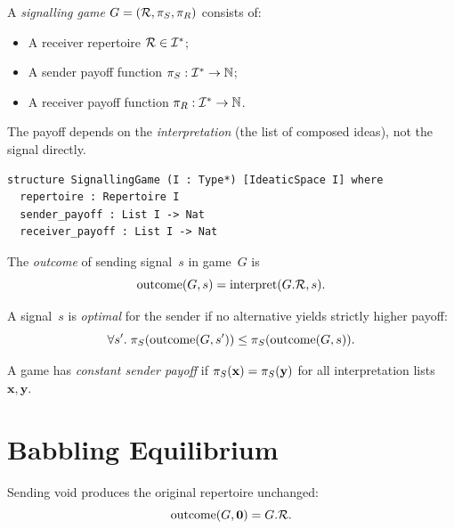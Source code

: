 \begin{definition}
\label{def:signalling-game}
A \emph{signalling game} $G = (\mathcal{R}, \pi_S, \pi_R)$ consists of:
\begin{itemize}
  \item A receiver repertoire $\mathcal{R} \in \mathcal{I}^*$;
  \item A sender payoff function $\pi_S : \mathcal{I}^* \to \mathbb{N}$;
  \item A receiver payoff function $\pi_R : \mathcal{I}^* \to \mathbb{N}$.
\end{itemize}
The payoff depends on the \emph{interpretation} (the list of composed
ideas), not the signal directly.
\end{definition}

\begin{lstlisting}[caption={SignallingGame in Lean~4},label=lst:signalling-game]
structure SignallingGame (I : Type*) [IdeaticSpace I] where
  repertoire : Repertoire I
  sender_payoff : List I -> Nat
  receiver_payoff : List I -> Nat
\end{lstlisting}

\begin{definition}[Outcome]
\label{def:outcome}
The \emph{outcome} of sending signal~$s$ in game~$G$ is
\[
  \operatorname{outcome}(G, s) = \operatorname{interpret}(G.\mathcal{R}, s).
\]
\end{definition}

\begin{definition}
\label{def:optimal-signal}
A signal~$s$ is \emph{optimal} for the sender if no alternative yields
strictly higher payoff:
\[
  \forall s'.\; \pi_S(\operatorname{outcome}(G, s'))
  \leq \pi_S(\operatorname{outcome}(G, s)).
\]
\end{definition}

\begin{definition}
\label{def:constant-payoff}
A game has \emph{constant sender payoff} if
$\pi_S(\mathbf{x}) = \pi_S(\mathbf{y})$ for all interpretation
lists~$\mathbf{x}, \mathbf{y}$.
\end{definition}

\section{Babbling Equilibrium}
\label{sec:ch2:babbling}

\begin{theorem}
\label{thm:babbling-outcome}
Sending void produces the original repertoire unchanged:
\[
  \operatorname{outcome}(G, \mathbf{0}) = G.\mathcal{R}.
\]
\end{theorem}

